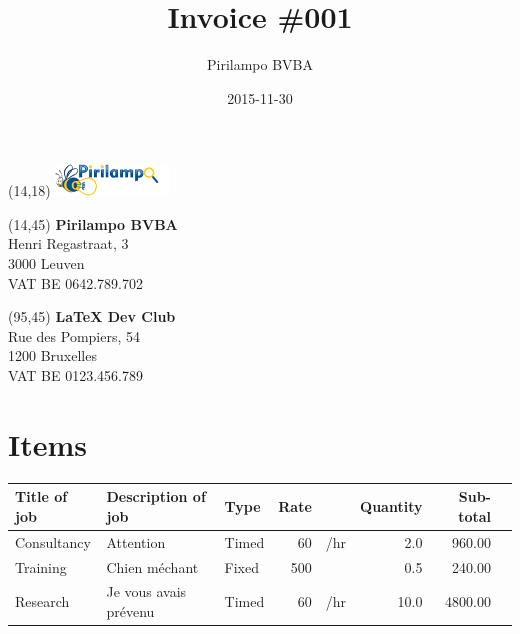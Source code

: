 \documentclass[a4paper,table]{article}
\author{Pirilampo BVBA}
\date{2015-11-30}
\title{Invoice \#001}
\begin{document}
\maketitle
{}

\begin{textblock}{40}(14,18) %
\noindent %
\includegraphics[width=30mm]{logo.png}
\end{textblock}

\begin{textblock}{65}(14,45) %
\vspace{8mm}
\noindent %
\textbf{Pirilampo BVBA} \\
Henri Regastraat, 3 \\
3000 Leuven \\
VAT BE 0642.789.702
\vspace{8mm}
\end{textblock}

\begin{textblock}{90}(95,45) %
\vspace{8mm}
\noindent %
\textbf{\LaTeX{} Dev Club} \\
Rue des Pompiers, 54 \\
1200 Bruxelles \\
VAT BE 0123.456.789
\vspace{8mm}
\end{textblock}

\vspace{65mm}

\section*{Items}
\label{sec:orgheadline1}

\extrarowsep=1mm

\begin{center}
\label{tab:orgtable1}

\begin{tabu}{lXlrlrrl}
Title of job & Description of job & Type & Rate &  & Quantity & Sub-total & \\
\hline
Consultancy & Attention & Timed & 60 & \texteuro{}/hr & 2.0 & 960.00 & \texteuro{}\\
Training & Chien méchant & Fixed & 500 & \texteuro{} & 0.5 & 240.00 & \texteuro{}\\
Research & Je vous avais prévenu & Timed & 60 & \texteuro{}/hr & 10.0 & 4800.00 & \texteuro{}\\
\end{tabu}
\end{center}
\end{document}
